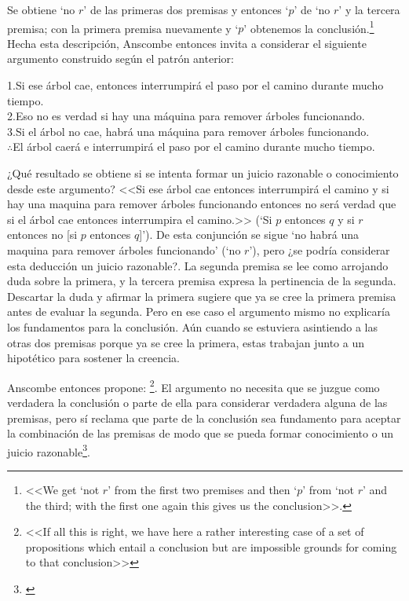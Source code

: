   Se obtiene `no $r$' de las primeras dos premisas y entonces `$p$' de `no $r$'
  y la tercera premisa; con la primera premisa nuevamente y `$p$' obtenemos la
  conclusión.{\footnote{\cite[299]{anscombe2015logic:qpa} <<We get `not $r$'
      from the first two premises and then `$p$' from `not $r$' and the third;
      with the first one again this gives us the conclusion>>.}} Hecha esta
  descripción, Anscombe entonces invita a considerar el siguiente argumento
  construido según el patrón anterior:
  \begin{adjustwidth}{1.2cm}{}
    1.\hspace{.459cm}Si ese árbol cae, entonces interrumpirá el paso por el camino
    durante mucho tiempo.\\
    2.\hspace{.459cm}Eso no es verdad si hay una máquina para remover árboles
    funcionando.\\
    3.\hspace{.459cm}Si el árbol no cae, habrá una máquina para remover árboles
    funcionando.\\
    $\therefore$\hspace{.459cm}El árbol caerá e interrumpirá el paso por el camino
    durante mucho tiempo.
  \end{adjustwidth}

  ¿Qué resultado se obtiene si se intenta formar un juicio razonable o
  conocimiento desde este argumento? <<Si ese árbol cae entonces interrumpirá el
  camino y si hay una maquina para remover árboles funcionando entonces no será
  verdad que si el árbol cae entonces interrumpira el camino.>> (`Si $p$
  entonces $q$ y si $r$ entonces no [si $p$ entonces $q$]'). De esta conjunción
  se sigue `no habrá una maquina para remover árboles funcionando' (`no $r$'),
  pero ¿se podría considerar esta deducción un juicio razonable?. La segunda
  premisa se lee como arrojando duda sobre la primera, y la tercera premisa
  expresa la pertinencia de la segunda. Descartar la duda y afirmar la primera
  sugiere que ya se cree la primera premisa antes de evaluar la segunda. Pero en
  ese caso el argumento mismo no explicaría los fundamentos para la conclusión.
  Aún cuando se estuviera asintiendo a las otras dos premisas porque ya se cree
  la primera, estas trabajan junto a un hipotético para sostener la
  creencia\autocite[Cf.~][300]{anscombe2015logic:qpa}.

  Anscombe entonces propone: \footnote{\cite[300]{anscombe2015logic:qpa} <<If all this is
    right, we have here a rather interesting case of a set of propositions which
    entail a conclusion but are impossible grounds for coming to that
    conclusion>>}. El argumento no necesita que se juzgue como verdadera la
  conclusión o parte de ella para considerar verdadera alguna de las premisas,
  pero sí reclama que parte de la conclusión sea fundamento para aceptar la
  combinación de las premisas de modo que se pueda formar conocimiento o un
  juicio razonable\footnote{\cite[Cf.~][301]{anscombe2015logic:qpa}}.


